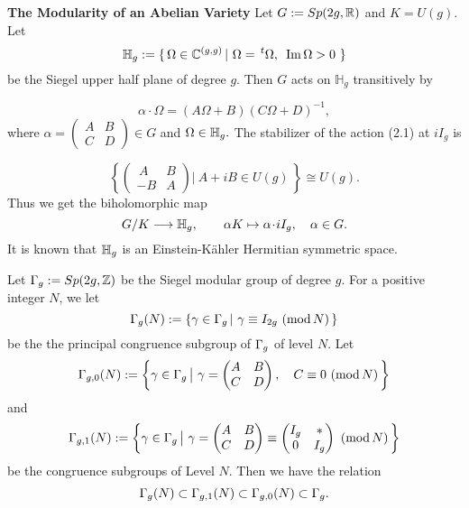 \documentclass[11pt]{amsart}
\begin{document}
\begin{section}{{\bf The Modularity of an Abelian Variety}}
\setcounter{equation}{0}
\vskip 2mm
Let $G:=Sp(2g,\mathbb R)$ and $K=U(g).$
Let
$$\BH_g:=\{\,\Omega\in\BC^{(g,g)}\,|\ \Omega=\,{}^t\Omega,\ \,{\rm{Im}}\,\Omega>0\ \}$$
be the Siegel upper half plane of degree $g$.
Then $G$ acts on ${\mathbb H}_g$ transitively by

\begin{equation*}
  \alpha\cdot \Omega=(A\Omega+B)(C\Omega+D)^{-1},
\end{equation*}
where $\alpha=\begin{pmatrix}
           A & B \\
           C & D
         \end{pmatrix}\in G$ and $\Omega\in \mathbb H_g.$
The stabilizer of the action (2.1) at $iI_g$ is

\begin{equation*}
  \left\{ \begin{pmatrix} \,A & B \\ -B & A \end{pmatrix} \Big| \ A+iB\in U(g)\,\right\}
  \cong U(g).
\end{equation*}
Thus we get the biholomorphic map
\begin{equation*}
G/K \longrightarrow \mathbb H_g, \qquad \alpha K \mapsto \alpha\!\cdot\! iI_g,  \quad \alpha\in G.
\end{equation*}
It is known that $\mathbb H_g$ is an Einstein-K{\"a}hler Hermitian symmetric space.

\vskip 3mm
Let $\Gamma_g:=Sp(2g,\mathbb Z)$ be the Siegel modular group of degree $g$.
For a positive integer $N$, we let
\begin{equation*}
  \G_g(N):=\left\{ \g\in \G_g\,|\ \g\equiv I_{2g}\ ({\rm{mod}}\,N)\,\right\}
\end{equation*}
be the the principal congruence subgroup of $\Gamma_g$ of level $N$. Let
\begin{equation*}
  \G_{g,0}(N):=\left\{ \g\in \G_g\,\big|\ \g=\begin{pmatrix}
                                       A & B \\
                                       C & D
                                     \end{pmatrix},\quad C\equiv 0\ ({\rm{mod}}\,N)\,\right\}
\end{equation*}
and
\begin{equation*}
  \Gamma_{g,1}(N):=\left\{ \gamma\in \Gamma_g\,\big| \
  \gamma=\begin{pmatrix}
      A & B \\
      C & D
     \end{pmatrix}\equiv \begin{pmatrix}
      I_g & * \\
      0 & I_g
     \end{pmatrix}\ ({\rm{mod}}\,N)\,\right\}
\end{equation*}
be the congruence subgroups of Level $N$. Then we have the relation
\begin{equation*}
  \Gamma_g (N)\subset \Gamma_{g,1} (N)\subset \Gamma_{g,0} (N)\subset \Gamma_g.
\end{equation*}


\end{section}
\end{document}
